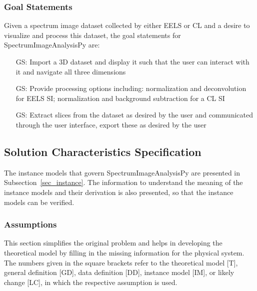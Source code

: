 \documentclass[12pt]{article}
\newcounter{goalnum} %
\newcommand{\progname}{SpectrumImageAnalysisPy} %
\begin{document}
\subsubsection{Goal Statements}

\noindent Given a spectrum image dataset collected by either EELS or CL and a desire to visualize and process this dataset, the goal statements for \progname{} are:

\begin{itemize}
	\item[GS\refstepcounter{goalnum}\thegoalnum \label{G_ImportDisplay}:] Import a 3D dataset and display it such that the user can interact with it and navigate all three dimensions
	\item[GS\refstepcounter{goalnum}\thegoalnum \label{G_Processing}:] Provide processing options including: normalization and deconvolution for EELS SI; normalization and background subtraction for a CL SI
	\item[GS\refstepcounter{goalnum}\thegoalnum \label{G_Extraction}:] Extract slices from the dataset as desired by the user and communicated through the user interface, export these as desired by the user
\end{itemize}

\subsection{Solution Characteristics Specification}

The instance models that govern \progname{} are presented in
Subsection~\ref{sec_instance}.  The information to understand the meaning of the
instance models and their derivation is also presented, so that the instance
models can be verified.

\subsubsection{Assumptions}

This section simplifies the original problem and helps in developing the
theoretical model by filling in the missing information for the physical
system. The numbers given in the square brackets refer to the theoretical model
[T], general definition [GD], data definition [DD], instance model [IM], or
likely change [LC], in which the respective assumption is used.
\end{document}
